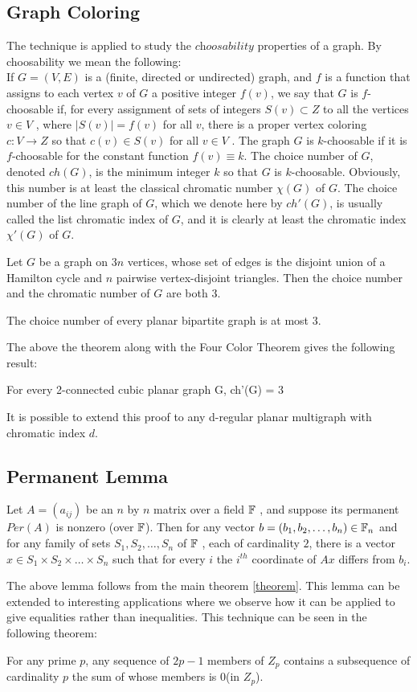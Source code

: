 \subsection{Graph Coloring}
The technique is applied to study the $\textit{choosability}$ properties of a graph. By choosability we mean the following:
\\
If $G = (V, E)$ is a (finite, directed or undirected) graph, and $f$ is a function that assigns to each vertex $v$ of $G$ a positive integer $f(v)$, we say that $G$ is $f$-choosable if, for every assignment of sets of integers $S(v) \subset Z$ to all the vertices $v \in V$ , where $|S(v)| = f(v)$ for all $v$, there is a proper vertex coloring $c : V \rightarrow Z$ so that $c(v) \in S(v)$ for all $v \in V$ . The graph $G$ is $k$-choosable if it is $f$-choosable for the constant function $f(v) \equiv k$. The choice number of $G$, denoted $ch(G)$, is the minimum integer $k$ so that $G$ is $k$-choosable. Obviously, this number is at least the classical chromatic number $\chi(G)$ of $G$. The choice number of the line graph of $G$, which we denote here by $ch'(G)$, is usually called the list chromatic index of $G$, and it is clearly at least the chromatic index $\chi'(G)$ of $G$.
\begin{theorem}
	Let $G$ be a graph on $3n$ vertices, whose set of edges is the disjoint union of a Hamilton cycle and $n$ pairwise vertex-disjoint triangles. Then the choice number and the chromatic number of $G$ are both $3$.
\end{theorem}
\begin{theorem}
	The choice number of every planar bipartite graph is at most $3$.
\end{theorem}
The above the theorem along with the Four Color Theorem gives the following result:
\begin{theorem}
	For every 2-connected cubic planar graph G, ch'(G) = 3
\end{theorem}
It is possible to extend this proof to any d-regular planar multigraph with chromatic index $d$.
\subsection{Permanent Lemma}
\begin{lemma}
	Let $A = (a_{ij})$ be an $n$ by $n$ matrix over a field ${\mathbb{F}}$ , and suppose its permanent $Per(A)$ is nonzero (over ${\mathbb{F}}$). Then for any vector $b = (b_1 , b_2 , \ldots, b_n) \in {\mathbb{F}}_n$ and for any family of sets $S_1 , S_2 , \ldots , S_n$ of ${\mathbb{F}}$ , each of cardinality $2$, there is a vector $x \in S_1 \times S_2 \times \ldots \times S_n$ such that for every $i$ the $i^{th}$ coordinate of $Ax$ differs from $b_i$.
\end{lemma}
The above lemma follows from the main theorem \ref{theorem}. This lemma can be extended to interesting applications where we observe how it can be applied to give equalities rather than inequalities. This technique can be seen in the following theorem:
\begin{theorem}
	For any prime $p$, any sequence of $2p - 1$ members of $Z_p$ contains a subsequence of cardinality $p$ the sum of whose members is $0$(in $Z_p$).
\end{theorem}
